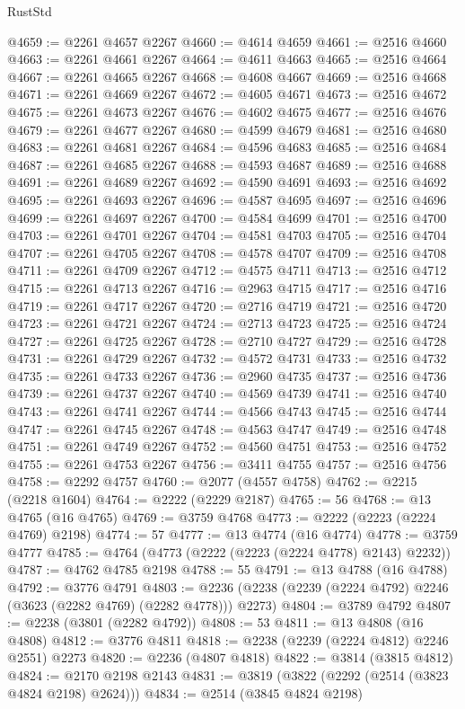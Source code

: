 \begin{lexlean}{RustStd}
\begin{coremodule}
@4659 := @2261 @4657 @2267
@4660 := @4614 @4659
@4661 := @2516 @4660
@4663 := @2261 @4661 @2267
@4664 := @4611 @4663
@4665 := @2516 @4664
@4667 := @2261 @4665 @2267
@4668 := @4608 @4667
@4669 := @2516 @4668
@4671 := @2261 @4669 @2267
@4672 := @4605 @4671
@4673 := @2516 @4672
@4675 := @2261 @4673 @2267
@4676 := @4602 @4675
@4677 := @2516 @4676
@4679 := @2261 @4677 @2267
@4680 := @4599 @4679
@4681 := @2516 @4680
@4683 := @2261 @4681 @2267
@4684 := @4596 @4683
@4685 := @2516 @4684
@4687 := @2261 @4685 @2267
@4688 := @4593 @4687
@4689 := @2516 @4688
@4691 := @2261 @4689 @2267
@4692 := @4590 @4691
@4693 := @2516 @4692
@4695 := @2261 @4693 @2267
@4696 := @4587 @4695
@4697 := @2516 @4696
@4699 := @2261 @4697 @2267
@4700 := @4584 @4699
@4701 := @2516 @4700
@4703 := @2261 @4701 @2267
@4704 := @4581 @4703
@4705 := @2516 @4704
@4707 := @2261 @4705 @2267
@4708 := @4578 @4707
@4709 := @2516 @4708
@4711 := @2261 @4709 @2267
@4712 := @4575 @4711
@4713 := @2516 @4712
@4715 := @2261 @4713 @2267
@4716 := @2963 @4715
@4717 := @2516 @4716
@4719 := @2261 @4717 @2267
@4720 := @2716 @4719
@4721 := @2516 @4720
@4723 := @2261 @4721 @2267
@4724 := @2713 @4723
@4725 := @2516 @4724
@4727 := @2261 @4725 @2267
@4728 := @2710 @4727
@4729 := @2516 @4728
@4731 := @2261 @4729 @2267
@4732 := @4572 @4731
@4733 := @2516 @4732
@4735 := @2261 @4733 @2267
@4736 := @2960 @4735
@4737 := @2516 @4736
@4739 := @2261 @4737 @2267
@4740 := @4569 @4739
@4741 := @2516 @4740
@4743 := @2261 @4741 @2267
@4744 := @4566 @4743
@4745 := @2516 @4744
@4747 := @2261 @4745 @2267
@4748 := @4563 @4747
@4749 := @2516 @4748
@4751 := @2261 @4749 @2267
@4752 := @4560 @4751
@4753 := @2516 @4752
@4755 := @2261 @4753 @2267
@4756 := @3411 @4755
@4757 := @2516 @4756
@4758 := @2292 @4757
@4760 := @2077 (@4557 @4758)
@4762 := @2215 (@2218 @1604)
@4764 := @2222 (@2229 @2187)
@4765 := 56
@4768 := @13 @4765 (@16 @4765)
@4769 := @3759 @4768
@4773 := @2222 (@2223 (@2224 @4769) @2198)
@4774 := 57
@4777 := @13 @4774 (@16 @4774)
@4778 := @3759 @4777
@4785 := @4764 (@4773 (@2222 (@2223 (@2224 @4778) @2143) @2232))
@4787 := @4762 @4785 @2198
@4788 := 55
@4791 := @13 @4788 (@16 @4788)
@4792 := @3776 @4791
@4803 := @2236 (@2238 (@2239 (@2224 @4792) @2246 (@3623 (@2282 @4769) (@2282 @4778))) @2273)
@4804 := @3789 @4792
@4807 := @2238 (@3801 (@2282 @4792))
@4808 := 53
@4811 := @13 @4808 (@16 @4808)
@4812 := @3776 @4811
@4818 := @2238 (@2239 (@2224 @4812) @2246 @2551) @2273
@4820 := @2236 (@4807 @4818)
@4822 := @3814 (@3815 @4812)
@4824 := @2170 @2198 @2143
@4831 := @3819 (@3822 (@2292 (@2514 (@3823 @4824 @2198) @2624)))
@4834 := @2514 (@3845 @4824 @2198)

\end{coremodule}
\end{lexlean}
